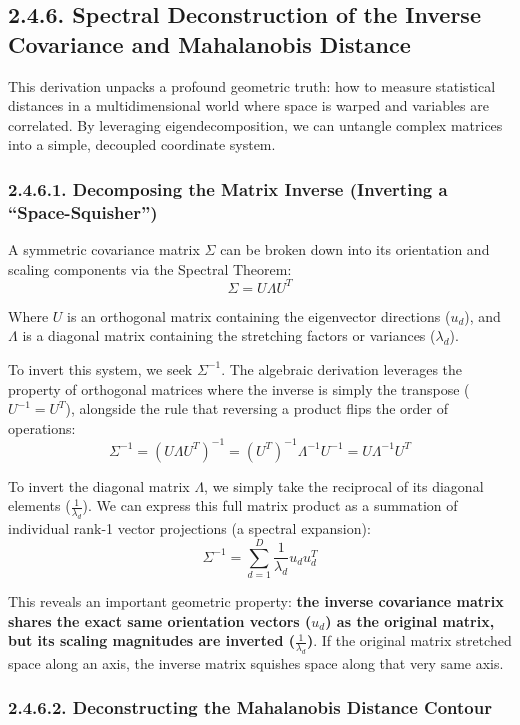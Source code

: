 \documentclass{article}
\begin{document}
\subsection*{2.4.6. Spectral Deconstruction of the Inverse Covariance and Mahalanobis Distance}

This derivation unpacks a profound geometric truth: how to measure statistical distances in a multidimensional world where space is warped and variables are correlated. By leveraging eigendecomposition, we can untangle complex matrices into a simple, decoupled coordinate system.

\subsubsection*{2.4.6.1. Decomposing the Matrix Inverse (Inverting a ``Space-Squisher'')}

A symmetric covariance matrix $\Sigma$ can be broken down into its orientation and scaling components via the Spectral Theorem:
\[ \Sigma = U \Lambda U^T \]

Where $U$ is an orthogonal matrix containing the eigenvector directions ($u_d$), and $\Lambda$ is a diagonal matrix containing the stretching factors or variances ($\lambda_d$). 

To invert this system, we seek $\Sigma^{-1}$. The algebraic derivation leverages the property of orthogonal matrices where the inverse is simply the transpose ($U^{-1} = U^T$), alongside the rule that reversing a product flips the order of operations:
\[ \Sigma^{-1} = (U \Lambda U^T)^{-1} = (U^T)^{-1} \Lambda^{-1} U^{-1} = U \Lambda^{-1} U^T \]

To invert the diagonal matrix $\Lambda$, we simply take the reciprocal of its diagonal elements ($\frac{1}{\lambda_d}$). We can express this full matrix product as a summation of individual rank-1 vector projections (a spectral expansion):
\[ \Sigma^{-1} = \sum_{d=1}^{D} \frac{1}{\lambda_d} u_d u_d^T \]

This reveals an important geometric property: \textbf{the inverse covariance matrix shares the exact same orientation vectors ($u_d$) as the original matrix, but its scaling magnitudes are inverted ($\frac{1}{\lambda_d}$)}. If the original matrix stretched space along an axis, the inverse matrix squishes space along that very same axis.

\subsubsection*{2.4.6.2. Deconstructing the Mahalanobis Distance Contour}
\end{document}
